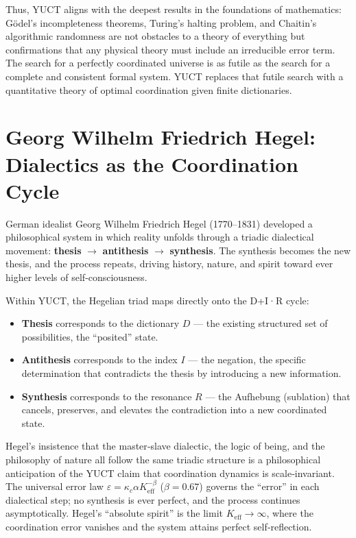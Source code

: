 \documentclass[12pt,a4paper]{article}
\begin{document}
	Thus, YUCT aligns with the deepest results in the foundations of mathematics: Gödel's incompleteness theorems, Turing's halting problem, and Chaitin's algorithmic randomness are not obstacles to a theory of everything but confirmations that any physical theory must include an irreducible error term. The search for a perfectly coordinated universe is as futile as the search for a complete and consistent formal system. YUCT replaces that futile search with a quantitative theory of optimal coordination given finite dictionaries.
	
	\section{Georg Wilhelm Friedrich Hegel: Dialectics as the Coordination Cycle}
	
	German idealist Georg Wilhelm Friedrich Hegel (1770–1831) developed a philosophical system in which reality unfolds through a triadic dialectical movement: \textbf{thesis} \(\to\) \textbf{antithesis} \(\to\) \textbf{synthesis}. The synthesis becomes the new thesis, and the process repeats, driving history, nature, and spirit toward ever higher levels of self‑consciousness.
	
	Within YUCT, the Hegelian triad maps directly onto the D+I·R cycle:
	\begin{itemize}
		\item \textbf{Thesis} corresponds to the dictionary \(D\) — the existing structured set of possibilities, the “posited” state.
		\item \textbf{Antithesis} corresponds to the index \(I\) — the negation, the specific determination that contradicts the thesis by introducing a new information.
		\item \textbf{Synthesis} corresponds to the resonance \(R\) — the Aufhebung (sublation) that cancels, preserves, and elevates the contradiction into a new coordinated state.
	\end{itemize}
	
	Hegel’s insistence that the master‑slave dialectic, the logic of being, and the philosophy of nature all follow the same triadic structure is a philosophical anticipation of the YUCT claim that coordination dynamics is scale‑invariant. The universal error law \(\varepsilon = \kappa_c \alpha K_{\mathrm{eff}}^{-\beta}\) (\(\beta=0.67\)) governs the “error” in each dialectical step; no synthesis is ever perfect, and the process continues asymptotically. Hegel’s “absolute spirit” is the limit \(K_{\mathrm{eff}} \to \infty\), where the coordination error vanishes and the system attains perfect self‑reflection.
	
\end{document}
